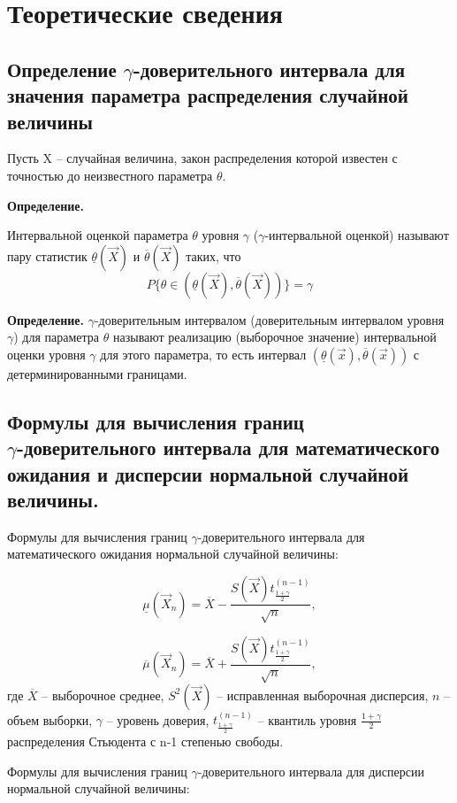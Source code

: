 \chapter{Теоретические сведения}

\section{Определение $\gamma$-доверительного интервала для значения параметра распределения случайной величины}

Пусть X -- случайная величина, закон распределения которой известен с точностью до неизвестного параметра $\theta$. 

\textbf{Определение.}

Интервальной оценкой параметра $\theta$ уровня $\gamma$ ($\gamma$-интервальной оценкой) называют пару статистик $\underline{\theta}(\vec X) \text{ и } \overline{\theta}(\vec X)$ таких, что $$P\{\theta \in (\underline{\theta}(\vec X), \overline{\theta}(\vec X))\}=\gamma$$ 


\textbf{Определение.}
$\gamma$-доверительным интервалом (доверительным интервалом уровня $\gamma$) для параметра $\theta$ называют реализацию (выборочное значение) интервальной оценки уровня $\gamma$ для этого параметра, то есть интервал $(\underline{\theta}(\vec x), \overline{\theta}(\vec x))$ с детерминированными границами.


\section{Формулы для вычисления границ \\ $\gamma$-доверительного интервала для математического ожидания и дисперсии нормальной случайной величины.}

Формулы для вычисления границ $\gamma$-доверительного интервала для математического ожидания нормальной случайной величины:

$$
\underline\mu(\vec X_n)=\overline X - \frac{S(\vec X)t^{(n-1)}_{\frac{1+\gamma}{2}}}{\sqrt{n}},
$$

$$
\overline\mu(\vec X_n)=\overline X + \frac{S(\vec X)t^{(n-1)}_{\frac{1+\gamma}{2}}}{\sqrt{n}},
$$
где $\overline X$ -- выборочное среднее, $S^2(\vec X)$ -- исправленная выборочная дисперсия, $n$ -- объем выборки, $\gamma$ -- уровень доверия, $t^{(n-1)}_{\frac{1+\gamma}{2}}$ -- квантиль уровня $\frac{1+\gamma}{2}$ распределения Стьюдента с n-1 степенью свободы.

Формулы для вычисления границ $\gamma$-доверительного интервала для дисперсии нормальной случайной величины:

